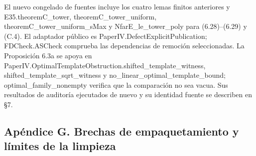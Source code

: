 \documentclass[spanish,11pt,a4paper]{article}
\newcounter{none}
\begin{document}
El nuevo congelado de fuentes incluye los cuatro lemas finitos anteriores y {\ttfamily\small E35.\discretionary{\hbox{\ensuremath{\hookrightarrow}}}{}{}theoremC\_\discretionary{\hbox{\ensuremath{\hookrightarrow}}}{}{}tower}, {\ttfamily\small theoremC\_\discretionary{\hbox{\ensuremath{\hookrightarrow}}}{}{}tower\_\discretionary{\hbox{\ensuremath{\hookrightarrow}}}{}{}uniform}, {\ttfamily\small theoremC\_\discretionary{\hbox{\ensuremath{\hookrightarrow}}}{}{}tower\_\discretionary{\hbox{\ensuremath{\hookrightarrow}}}{}{}uniform\_\discretionary{\hbox{\ensuremath{\hookrightarrow}}}{}{}sMax} y {\ttfamily\small NfarE\_\discretionary{\hbox{\ensuremath{\hookrightarrow}}}{}{}le\_\discretionary{\hbox{\ensuremath{\hookrightarrow}}}{}{}tower\_\discretionary{\hbox{\ensuremath{\hookrightarrow}}}{}{}poly} para (6.28)--(6.29) y (C.4). El adaptador público es {\ttfamily\small PaperIV.\discretionary{\hbox{\ensuremath{\hookrightarrow}}}{}{}DefectExplic\discretionary{\hbox{\ensuremath{\hookrightarrow}}}{}{}itPublicatio\discretionary{\hbox{\ensuremath{\hookrightarrow}}}{}{}n}; {\ttfamily\small FDCheck.\discretionary{\hbox{\ensuremath{\hookrightarrow}}}{}{}ASCheck} comprueba las dependencias de remoción seleccionadas. La Proposición 6.3a se apoya en {\ttfamily\small PaperIV.\discretionary{\hbox{\ensuremath{\hookrightarrow}}}{}{}OptimalTempl\discretionary{\hbox{\ensuremath{\hookrightarrow}}}{}{}ateObstructi\discretionary{\hbox{\ensuremath{\hookrightarrow}}}{}{}on.\discretionary{\hbox{\ensuremath{\hookrightarrow}}}{}{}shifted\_\discretionary{\hbox{\ensuremath{\hookrightarrow}}}{}{}template\_\discretionary{\hbox{\ensuremath{\hookrightarrow}}}{}{}witness}, {\ttfamily\small shifted\_\discretionary{\hbox{\ensuremath{\hookrightarrow}}}{}{}template\_\discretionary{\hbox{\ensuremath{\hookrightarrow}}}{}{}sqrt\_\discretionary{\hbox{\ensuremath{\hookrightarrow}}}{}{}witness} y {\ttfamily\small no\_\discretionary{\hbox{\ensuremath{\hookrightarrow}}}{}{}linear\_\discretionary{\hbox{\ensuremath{\hookrightarrow}}}{}{}optimal\_\discretionary{\hbox{\ensuremath{\hookrightarrow}}}{}{}template\_\discretionary{\hbox{\ensuremath{\hookrightarrow}}}{}{}bound}; {\ttfamily\small optimal\_\discretionary{\hbox{\ensuremath{\hookrightarrow}}}{}{}family\_\discretionary{\hbox{\ensuremath{\hookrightarrow}}}{}{}nonempty} verifica que la comparación no sea vacua. Sus resultados de auditoría ejecutados de nuevo y su identidad fuente se describen en §7.

\subsection{Apéndice G. Brechas de empaquetamiento y límites de la limpieza}\label{apendice-g.-brechas-de-empaquetamiento-y-limites-de-la-limpieza}
\end{document}
